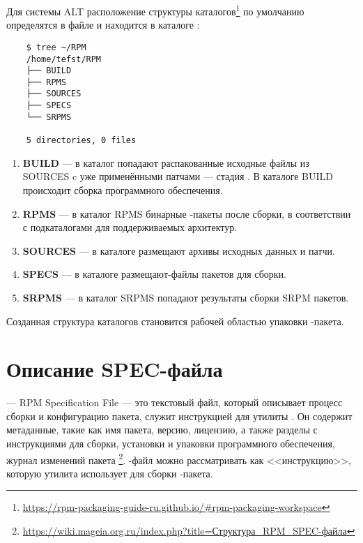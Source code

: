 Для системы ALT расположение структуры каталогов\footnote{\href{https://rpm-packaging-guide-ru.github.io/\#rpm-packaging-workspace}{https://rpm-packaging-guide-ru.github.io/\#rpm-packaging-workspace}} по умолчанию определятся в файле  и находится в каталоге :
\begin{verbatim}
	$ tree ~/RPM
	/home/tefst/RPM
	├── BUILD
	├── RPMS
	├── SOURCES
	├── SPECS
	└── SRPMS
	
	5 directories, 0 files
\end{verbatim}

\begin{enumerate}
	\item \textbf{BUILD} --- в каталог попадают распакованные исходные файлы из SOURCES c уже применёнными патчами --- стадия . В каталоге BUILD происходит сборка программного обеспечения.
	
	\item \textbf{RPMS} --- в каталог RPMS бинарные -пакеты после сборки, в соответствии с подкаталогами для поддерживаемых архитектур.
	
	\item \textbf{SOURCES} --- в каталоге размещают архивы исходных данных и патчи.
	
	\item \textbf{SPECS} --- в каталоге размещают-файлы пакетов для сборки.
	
	\item \textbf{SRPMS} --- в каталог SRPMS попадают результаты сборки SRPM пакетов.
\end{enumerate}

Созданная структура каталогов становится рабочей областью упаковки -пакета.



\section{Описание SPEC-файла}
 --- RPM Specification File --- это текстовый файл, который описывает процесс сборки и конфигурацию 
пакета, служит инструкцией для утилиты . Он содержит метаданные, такие как имя пакета, версию, 
лицензию, а также разделы с инструкциями для сборки, установки и упаковки программного обеспечения, журнал 
изменений пакета%
\footnote{\href{https://wiki.mageia.org.ru/index.php?title=\%D0\%A1\%D1\%82\%D1\%80\%D1\%83\%D0\%BA\%D1\%82\%D1\%83\%D1\%80\%D0\%B0_RPM_SPEC-\%D1\%84\%D0\%B0\%D0\%B9\%D0\%BB\%D0\%B0}%
{https://wiki.mageia.org.ru/index.php?title=Структура\_RPM\_SPEC-файла}}. %
-файл можно рассматривать как <<инструкцию>>, которую утилита  использует для сборки -пакета.

